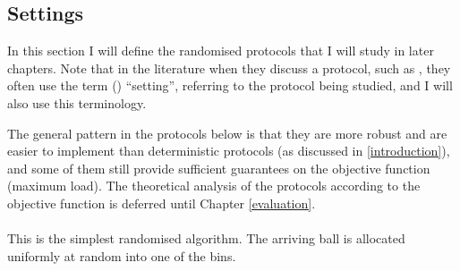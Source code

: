 







\subsection{Settings} \label{settings}

In this section I will define the randomised protocols that I will study in later chapters. Note that in the literature when they discuss a protocol, such as \OneChoice, they often use the term (\OneChoice) ``setting'', referring to the protocol being studied, and I will also use this terminology.

The general pattern in the protocols below is that they are more robust and are easier to implement than deterministic protocols (as discussed in \cref{introduction}), and some of them still provide sufficient guarantees on the objective function (maximum load). The theoretical analysis of the protocols according to the objective function is deferred until Chapter \ref{evaluation}.


\paragraph{\OneChoice}

This is the simplest randomised algorithm. The arriving ball is allocated uniformly at random into one of the bins.

